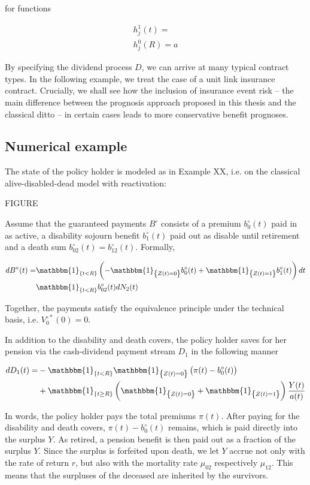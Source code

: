 \documentclass{book}
\newcommand{\1}[1]{\mathbbm{1}_{\left\lbrace #1 \right\rbrace}}
\theoremstyle{break}
\theoremstyle{remark}
\numberwithin{equation}{section}
\begin{document}
for functions

\begin{align*}
	h_j^1(t) = \\
	h_j^0(R) = a
\end{align*}

By specifying the dividend process $D$, we can arrive at many typical contract types. In the following example, we treat the case of a unit link insurance contract. Crucially, we shall see how the inclusion of insurance event risk -- the main difference between the prognosis approach proposed in this thesis and the classical ditto -- in certain cases leads to more conservative benefit prognoses.

\subsection{Numerical example}
	
The state of the policy holder is modeled as in Example XX, i.e. on the classical alive-disabled-dead model with reactivation:

FIGURE

Assume that the guaranteed payments $B^\circ$ consists of a premium $b_0^\circ(t)$ paid in as active, a disability sojourn benefit $b_1^\circ(t)$ paid out as disable until retirement and a death sum $b_{02}^\circ(t)=b_{12}^\circ(t)$. Formally,

\begin{align*}
	dB^\circ(t) =& \1{t<R} \left( - \1{Z(t)=0} b_0^\circ(t) + \1{Z(t)=1} b_1^\circ(t) \right) dt \\
	& \1{t < R} b_{02}^\circ(t) dN_2(t) \\
\end{align*}

Together, the payments satisfy the equivalence principle under the technical basis, i.e. $V_0^{\circ*}(0)=0$.

In addition to the disability and death covers, the policy holder saves for her pension via the cash-dividend payment stream $D_1$ in the following manner

\begin{align*}
	dD_1(t) =& - \1{t<R} \1{Z(t)=0} \left( \pi(t) - b_0^\circ(t) \right) \\
	&+ \1{t \geq R} \left( \1{Z(t)=0} + \1{Z(t)=1} \right) \frac{Y(t)}{a(t)}
\end{align*}

In words, the policy holder pays the total premiums $\pi(t)$. After paying for the disability and death covers, $\pi(t) - b_0^\circ(t)$ remains, which is paid directly into the surplus $Y$. As retired, a pension benefit is then paid out as a fraction of the surplus $Y$. Since the surplus is forfeited upon death, we let $Y$ accrue not only with the rate of return $r$, but also with the mortality rate $\mu_{02}$ respectively $\mu_{12}$. This means that the surpluses of the deceased are inherited by the survivors.
\end{document}
